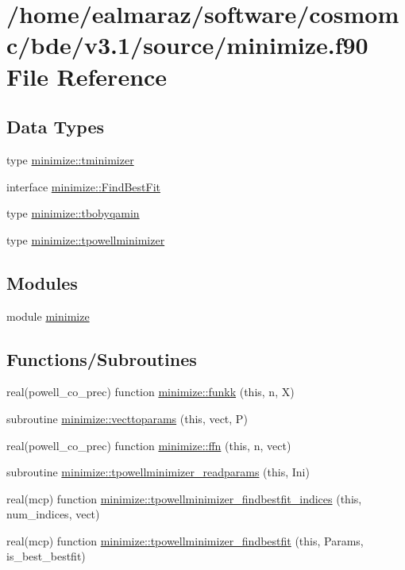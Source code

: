 \hypertarget{minimize_8f90}{}\section{/home/ealmaraz/software/cosmomc/bde/v3.1/source/minimize.f90 File Reference}
\label{minimize_8f90}
\subsection*{Data Types}
\begin{DoxyCompactItemize}
\item 
type \mbox{\hyperlink{structminimize_1_1tminimizer}{minimize\+::tminimizer}}
\item 
interface \mbox{\hyperlink{interfaceminimize_1_1FindBestFit}{minimize\+::\+Find\+Best\+Fit}}
\item 
type \mbox{\hyperlink{structminimize_1_1tbobyqamin}{minimize\+::tbobyqamin}}
\item 
type \mbox{\hyperlink{structminimize_1_1tpowellminimizer}{minimize\+::tpowellminimizer}}
\end{DoxyCompactItemize}
\subsection*{Modules}
\begin{DoxyCompactItemize}
\item 
module \mbox{\hyperlink{namespaceminimize}{minimize}}
\end{DoxyCompactItemize}
\subsection*{Functions/\+Subroutines}
\begin{DoxyCompactItemize}
\item 
real(powell\+\_\+co\+\_\+prec) function \mbox{\hyperlink{namespaceminimize_af3ef2c6576f50826eb90dd328260fa29}{minimize\+::funkk}} (this, n, X)
\item 
subroutine \mbox{\hyperlink{namespaceminimize_ae5c43479fd4ab1a7fef6e43a93442e37}{minimize\+::vecttoparams}} (this, vect, P)
\item 
real(powell\+\_\+co\+\_\+prec) function \mbox{\hyperlink{namespaceminimize_a889da62b8c66a41e77a9d67f66d677ed}{minimize\+::ffn}} (this, n, vect)
\item 
subroutine \mbox{\hyperlink{namespaceminimize_a2781b5142c2289caf0a2221442578c02}{minimize\+::tpowellminimizer\+\_\+readparams}} (this, Ini)
\item 
real(mcp) function \mbox{\hyperlink{namespaceminimize_a0ac8b152c3df29a4c741afc485238419}{minimize\+::tpowellminimizer\+\_\+findbestfit\+\_\+indices}} (this, num\+\_\+indices, vect)
\item 
real(mcp) function \mbox{\hyperlink{namespaceminimize_a203054a48736df092e62d1deffc3178d}{minimize\+::tpowellminimizer\+\_\+findbestfit}} (this, Params, is\+\_\+best\+\_\+bestfit)
\end{DoxyCompactItemize}
